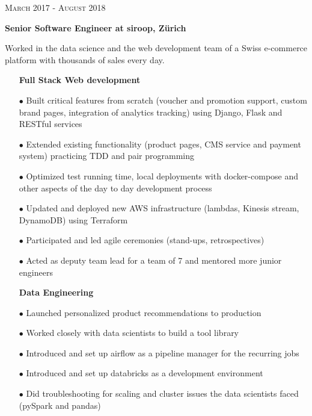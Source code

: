 \documentclass[10pt]{article} %
\begin{document}
\begin{minipage}[t]{0.5\textwidth}
{\raggedleft\textsc{March 2017 - August 2018}\par}

{\raggedright\large \textbf{Senior Software Engineer at siroop, Z\"urich}\\
}

\normalsize{Worked in the data science and the web development team of a Swiss e-commerce platform with thousands of sales every day.}
\begin{itemize}
\item[] \textbf{Full Stack Web development}
\item[$\bullet$] Built critical features from scratch (voucher and promotion support, custom brand pages, integration of analytics tracking) using Django, Flask and RESTful services
\item[$\bullet$] Extended existing functionality (product pages, CMS service and payment system) practicing TDD and pair programming
\item[$\bullet$] Optimized test running time, local deployments with docker-compose and other aspects of the day to day development process
\item[$\bullet$] Updated and deployed new AWS infrastructure (lambdas, Kinesis stream, DynamoDB) using Terraform
\item[$\bullet$] Participated and led agile ceremonies (stand-ups, retrospectives)
\item[$\bullet$] Acted as deputy team lead for a team of 7 and mentored more junior engineers
\end{itemize}

\begin{itemize}
\item[] \textbf{Data Engineering}
\item[$\bullet$] Launched personalized product recommendations to production
\item[$\bullet$] Worked closely with data scientists to build a tool library
\item[$\bullet$] Introduced and set up airflow as a pipeline manager for the recurring jobs
\item[$\bullet$] Introduced and set up databricks as a development environment
\item[$\bullet$] Did troubleshooting for scaling and cluster issues the data scientists faced (pySpark and pandas)
\end{itemize}





\end{minipage}
\end{document}
